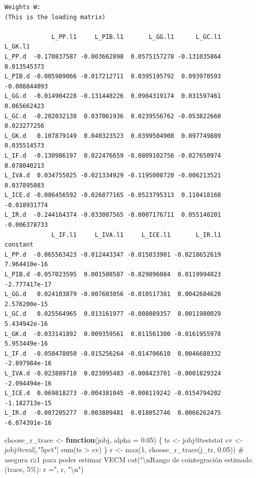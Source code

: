 \documentclass[
  spanish,
  letterpaper,
  DIV=11,
  numbers=noendperiod]{scrartcl}
\newenvironment{Shaded}{\begin{snugshade}}{\end{snugshade}}
\newcommand{\AttributeTok}[1]{\textcolor[rgb]{0.40,0.45,0.13}{#1}}
\newcommand{\CommentTok}[1]{\textcolor[rgb]{0.37,0.37,0.37}{#1}}
\newcommand{\ControlFlowTok}[1]{\textcolor[rgb]{0.00,0.23,0.31}{\textbf{#1}}}
\newcommand{\DecValTok}[1]{\textcolor[rgb]{0.68,0.00,0.00}{#1}}
\newcommand{\FloatTok}[1]{\textcolor[rgb]{0.68,0.00,0.00}{#1}}
\newcommand{\FunctionTok}[1]{\textcolor[rgb]{0.28,0.35,0.67}{#1}}
\newcommand{\NormalTok}[1]{\textcolor[rgb]{0.00,0.23,0.31}{#1}}
\newcommand{\OtherTok}[1]{\textcolor[rgb]{0.00,0.23,0.31}{#1}}
\newcommand{\SpecialCharTok}[1]{\textcolor[rgb]{0.37,0.37,0.37}{#1}}
\newcommand{\StringTok}[1]{\textcolor[rgb]{0.13,0.47,0.30}{#1}}
\begin{document}
\begin{verbatim}
Weights W:
(This is the loading matrix)

             L_PP.l1     L_PIB.l1       L_GG.l1      L_GC.l1      L_GK.l1
L_PP.d  -0.170837587 -0.003662898  0.0575157278 -0.131035864  0.013545373
L_PIB.d -0.005989066 -0.017212711  0.0395195792  0.093970593 -0.008844093
L_GG.d  -0.014904228 -0.131448226  0.0984319174  0.031597461  0.065662423
L_GC.d  -0.202032138  0.037061936  0.0239556762 -0.053822660  0.023277256
L_GK.d   0.107879149  0.040323523  0.0399504908  0.097749889  0.035514573
L_IF.d  -0.130986197  0.022476659 -0.0809102756 -0.027650974  0.078040213
L_IVA.d  0.034755025 -0.021334929 -0.1195008720 -0.006213521  0.037895083
L_ICE.d -0.086456592 -0.026877165 -0.0523795313  0.110418160 -0.018931774
L_IR.d  -0.244164374 -0.033087565 -0.0007176711  0.055140201 -0.006378733
             L_IF.l1     L_IVA.l1     L_ICE.l1       L_IR.l1      constant
L_PP.d  -0.065563423 -0.012443347 -0.015033901 -0.0218652619  7.964410e-16
L_PIB.d -0.057023595  0.001508587 -0.029896084  0.0119994823 -2.777417e-17
L_GG.d   0.024103879 -0.007603056 -0.010517381  0.0042684620  2.576200e-15
L_GC.d   0.025564965  0.013161977 -0.008089357  0.0011980029  5.434942e-16
L_GK.d  -0.033141892  0.009359561  0.011561300 -0.0161955978  5.953449e-16
L_IF.d  -0.050478050 -0.015256264 -0.014706610  0.0046688332 -2.897984e-16
L_IVA.d -0.023889710  0.023095483 -0.008423701 -0.0001829324 -2.094494e-16
L_ICE.d  0.069818273 -0.004381045 -0.008119242 -0.0154794202 -1.182713e-15
L_IR.d  -0.007205277  0.003809481  0.018052746  0.0066262475 -6.074391e-16
\end{verbatim}

\begin{Shaded}
\begin{Highlighting}[]
\NormalTok{choose\_r\_trace }\OtherTok{\textless{}{-}} \ControlFlowTok{function}\NormalTok{(jobj, }\AttributeTok{alpha =} \FloatTok{0.05}\NormalTok{) \{}
\NormalTok{  ts }\OtherTok{\textless{}{-}}\NormalTok{ jobj}\SpecialCharTok{@}\NormalTok{teststat}
\NormalTok{  cv }\OtherTok{\textless{}{-}}\NormalTok{ jobj}\SpecialCharTok{@}\NormalTok{cval[,}\StringTok{"5pct"}\NormalTok{]}
  \FunctionTok{sum}\NormalTok{(ts }\SpecialCharTok{\textgreater{}}\NormalTok{ cv)}
\NormalTok{\}}
\NormalTok{r }\OtherTok{\textless{}{-}} \FunctionTok{max}\NormalTok{(}\DecValTok{1}\NormalTok{, }\FunctionTok{choose\_r\_trace}\NormalTok{(j\_tr, }\FloatTok{0.05}\NormalTok{))   }\CommentTok{\# asegura r≥1 para poder estimar VECM}
\FunctionTok{cat}\NormalTok{(}\StringTok{"}\SpecialCharTok{\textbackslash{}n}\StringTok{Rango de cointegración estimado (trace, 5\%): r ="}\NormalTok{, r, }\StringTok{"}\SpecialCharTok{\textbackslash{}n}\StringTok{"}\NormalTok{)}
\end{Highlighting}
\end{Shaded}
\end{document}
